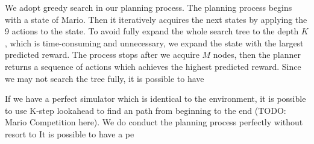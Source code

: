 We adopt greedy search in our planning process.
The planning process begins with a state of Mario. 
Then it iteratively acquires the next states by applying
the 9 actions to the state. To avoid fully expand the whole search tree to 
the depth $K$, which is time-consuming and unnecessary, we expand the state
with the largest predicted reward. 
The process stops after we acquire $M$ nodes, then the planner returns 
a sequence of actions which achieves the highest predicted reward.
Since we may not search the tree fully, it is possible to have 


%

If we have a perfect simulator which is identical to the environment, 
it is possible to use K-step lookahead to find an path from beginning
to the end (TODO: Mario Competition here). We do 
conduct the planning process perfectly without 
resort to 
It is possible to have a pe
\endinput




